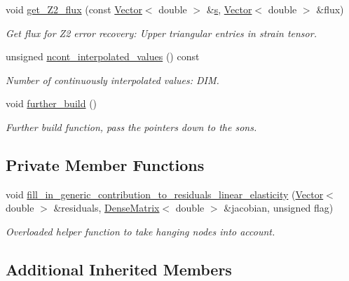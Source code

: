 \begin{DoxyCompactItemize}
void \hyperlink{classoomph_1_1RefineableLinearElasticityEquations_aa3b8251eb0a6d153eb7de8b032c1ffcd}{get\+\_\+\+Z2\+\_\+flux} (const \hyperlink{classoomph_1_1Vector}{Vector}$<$ double $>$ \&\hyperlink{cfortran_8h_ab7123126e4885ef647dd9c6e3807a21c}{s}, \hyperlink{classoomph_1_1Vector}{Vector}$<$ double $>$ \&flux)
\begin{DoxyCompactList}\small\item\em Get \textquotesingle{}flux\textquotesingle{} for Z2 error recovery\+: Upper triangular entries in strain tensor. \end{DoxyCompactList}\item 
unsigned \hyperlink{classoomph_1_1RefineableLinearElasticityEquations_a1a06914f28c80c10dfb485353a3ea677}{ncont\+\_\+interpolated\+\_\+values} () const
\begin{DoxyCompactList}\small\item\em Number of continuously interpolated values\+: D\+IM. \end{DoxyCompactList}\item 
void \hyperlink{classoomph_1_1RefineableLinearElasticityEquations_a59edb90bae16d51048fb8401a91354a3}{further\+\_\+build} ()
\begin{DoxyCompactList}\small\item\em Further build function, pass the pointers down to the sons. \end{DoxyCompactList}\end{DoxyCompactItemize}
\subsection*{Private Member Functions}
\begin{DoxyCompactItemize}
\item 
void \hyperlink{classoomph_1_1RefineableLinearElasticityEquations_ae2f77382b9fdb12eb7b4ba0dc6c239ef}{fill\+\_\+in\+\_\+generic\+\_\+contribution\+\_\+to\+\_\+residuals\+\_\+linear\+\_\+elasticity} (\hyperlink{classoomph_1_1Vector}{Vector}$<$ double $>$ \&residuals, \hyperlink{classoomph_1_1DenseMatrix}{Dense\+Matrix}$<$ double $>$ \&jacobian, unsigned flag)
\begin{DoxyCompactList}\small\item\em Overloaded helper function to take hanging nodes into account. \end{DoxyCompactList}\end{DoxyCompactItemize}
\subsection*{Additional Inherited Members}


